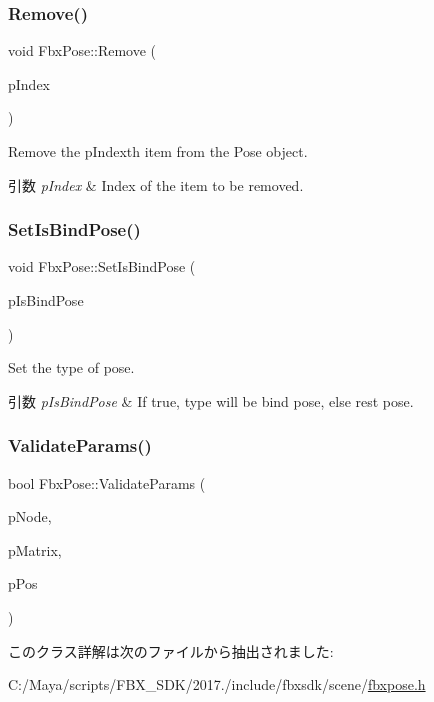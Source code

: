 \subsubsection{\texorpdfstring{Remove()}{Remove()}}
{\footnotesize\ttfamily void Fbx\+Pose\+::\+Remove (\begin{DoxyParamCaption}\item[{int}]{p\+Index }\end{DoxyParamCaption})}

Remove the p\+Indexth item from the Pose object. 
\begin{DoxyParams}{引数}
{\em p\+Index} & Index of the item to be removed. \\
\hline
\end{DoxyParams}
\mbox{\label{class_fbx_pose_ac7248f7018e656e1f95e1824d5f3b529}} 
\subsubsection{\texorpdfstring{Set\+Is\+Bind\+Pose()}{SetIsBindPose()}}
{\footnotesize\ttfamily void Fbx\+Pose\+::\+Set\+Is\+Bind\+Pose (\begin{DoxyParamCaption}\item[{bool}]{p\+Is\+Bind\+Pose }\end{DoxyParamCaption})}

Set the type of pose. 
\begin{DoxyParams}{引数}
{\em p\+Is\+Bind\+Pose} & If true, type will be bind pose, else rest pose. \\
\hline
\end{DoxyParams}
\mbox{\label{class_fbx_pose_ae776ba435dfd811a0c720365bcb94682}} 
\subsubsection{\texorpdfstring{Validate\+Params()}{ValidateParams()}}
{\footnotesize\ttfamily bool Fbx\+Pose\+::\+Validate\+Params (\begin{DoxyParamCaption}\item[{const \hyperlink{class_fbx_node}{Fbx\+Node} $\ast$}]{p\+Node,  }\item[{const \hyperlink{class_fbx_matrix}{Fbx\+Matrix} \&}]{p\+Matrix,  }\item[{int \&}]{p\+Pos }\end{DoxyParamCaption})\hspace{0.3cm}{\ttfamily [protected]}}



このクラス詳解は次のファイルから抽出されました\+:\begin{DoxyCompactItemize}
\item 
C\+:/\+Maya/scripts/\+F\+B\+X\+\_\+\+S\+D\+K/2017./include/fbxsdk/scene/\hyperlink{fbxpose_8h}{fbxpose.\+h}\end{DoxyCompactItemize}
